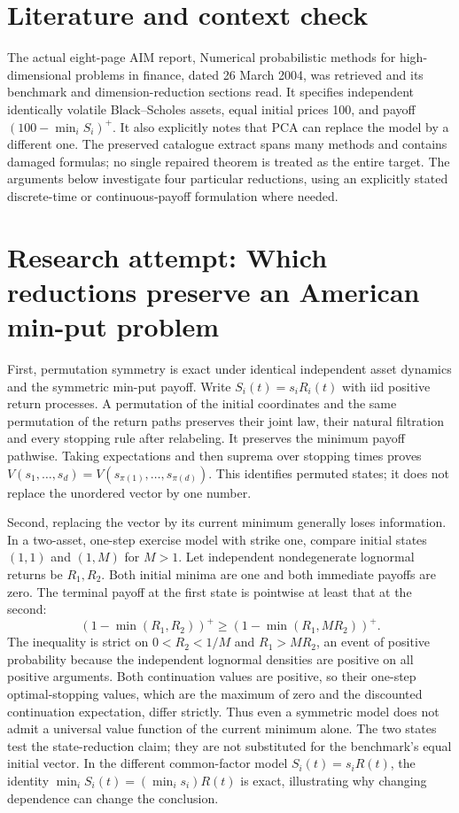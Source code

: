\documentclass[11pt]{article}
\begin{document}
\section{Literature and context check}
The actual eight-page AIM report, Numerical probabilistic methods for high-dimensional problems in finance, dated 26 March 2004, was retrieved and its benchmark and dimension-reduction sections read. It specifies independent identically volatile Black--Scholes assets, equal initial prices 100, and payoff $(100-\min_iS_i)^+$. It also explicitly notes that PCA can replace the model by a different one. The preserved catalogue extract spans many methods and contains damaged formulas; no single repaired theorem is treated as the entire target. The arguments below investigate four particular reductions, using an explicitly stated discrete-time or continuous-payoff formulation where needed.
\section{Research attempt: Which reductions preserve an American min-put problem}
First, permutation symmetry is exact under identical independent asset dynamics and the symmetric min-put payoff. Write $S_i(t)=s_iR_i(t)$ with iid positive return processes. A permutation of the initial coordinates and the same permutation of the return paths preserves their joint law, their natural filtration and every stopping rule after relabeling. It preserves the minimum payoff pathwise. Taking expectations and then suprema over stopping times proves $V(s_1,\ldots,s_d)=V(s_{\pi(1)},\ldots,s_{\pi(d)})$. This identifies permuted states; it does not replace the unordered vector by one number.

Second, replacing the vector by its current minimum generally loses information. In a two-asset, one-step exercise model with strike one, compare initial states $(1,1)$ and $(1,M)$ for $M>1$. Let independent nondegenerate lognormal returns be $R_1,R_2$. Both initial minima are one and both immediate payoffs are zero. The terminal payoff at the first state is pointwise at least that at the second:
\[
 (1-\min(R_1,R_2))^+\geq(1-\min(R_1,MR_2))^+.
\]
The inequality is strict on $0<R_2<1/M$ and $R_1>MR_2$, an event of positive probability because the independent lognormal densities are positive on all positive arguments. Both continuation values are positive, so their one-step optimal-stopping values, which are the maximum of zero and the discounted continuation expectation, differ strictly. Thus even a symmetric model does not admit a universal value function of the current minimum alone. The two states test the state-reduction claim; they are not substituted for the benchmark's equal initial vector. In the different common-factor model $S_i(t)=s_iR(t)$, the identity $\min_iS_i(t)=(\min_i s_i)R(t)$ is exact, illustrating why changing dependence can change the conclusion.
\end{document}

